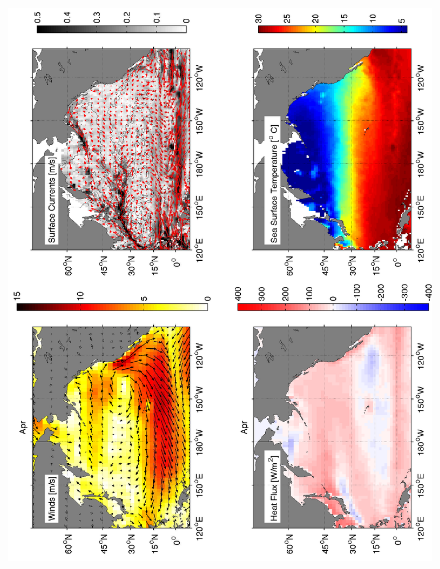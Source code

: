 \begin{figure}[hbt]
  \begin{center}
  \includegraphics[angle=270]{figs/WindOverview/SurfaceCurrents04}
    \caption{}
    \label{fig:}  
  \end{center}
\end{figure}


